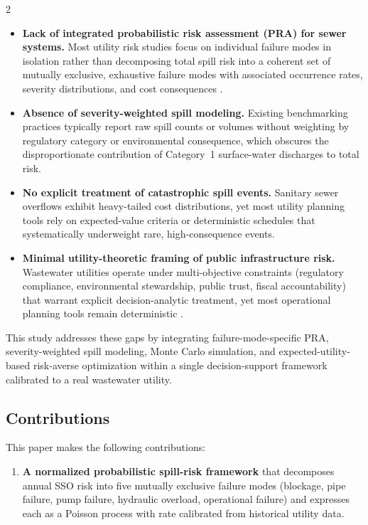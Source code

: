 \documentclass[10pt]{article}
\begin{document}
\begin{multicols}{2}
\begin{itemize}[leftmargin=*]
    \item \textbf{Lack of integrated probabilistic risk assessment (PRA)
    for sewer systems.} Most utility risk studies focus on individual
    failure modes in isolation rather than decomposing total spill risk
    into a coherent set of mutually exclusive, exhaustive failure modes
    with associated occurrence rates, severity distributions, and cost
    consequences \citep{johnson2021}.
 
    \item \textbf{Absence of severity-weighted spill modeling.} Existing
    benchmarking practices typically report raw spill counts or volumes
    without weighting by regulatory category or environmental consequence,
    which obscures the disproportionate contribution of Category~1
    surface-water discharges to total risk.
 
    \item \textbf{No explicit treatment of catastrophic spill events.}
    Sanitary sewer overflows exhibit heavy-tailed cost distributions, yet
    most utility planning tools rely on expected-value criteria or
    deterministic schedules that systematically underweight rare,
    high-consequence events.
 
    \item \textbf{Minimal utility-theoretic framing of public
    infrastructure risk.} Wastewater utilities operate under
    multi-objective constraints (regulatory compliance, environmental
    stewardship, public trust, fiscal accountability) that warrant
    explicit decision-analytic treatment, yet most operational planning
    tools remain deterministic \citep{halfawy2008}.
\end{itemize}
 
This study addresses these gaps by integrating failure-mode-specific PRA,
severity-weighted spill modeling, Monte Carlo simulation, and
expected-utility-based risk-averse optimization within a single
decision-support framework calibrated to a real wastewater utility.
 
\subsection{Contributions}
 
This paper makes the following contributions:
 
\begin{enumerate}[leftmargin=*]
    \item \textbf{A normalized probabilistic spill-risk framework} that
    decomposes annual SSO risk into five mutually exclusive failure modes
    (blockage, pipe failure, pump failure, hydraulic overload, operational
    failure) and expresses each as a Poisson process with rate calibrated
    from historical utility data.
 

\end{enumerate}
\end{multicols}
\end{document}
